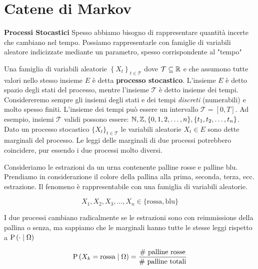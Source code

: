\chapter{Catene di Markov}

\begin{defn}
	\textbf{Processi Stocastici}
	Spesso abbiamo bisogno di rappresentare quantità incerte che cambiano nel tempo. Possiamo rappresentarle con famiglie di variabili aleatore indicizzate mediante un parametro, spesso corrispondente al "tempo"
	
	Una famiglia di variabili aleatorie $ \left\{X_t\right\}_{t\in \mathcal{T}} $ dove $ \mathcal{T} \subseteq \mathbb{R} $ e che assumono tutte valori nello stesso insieme $ E $ è detta \textbf{processo stocastico}. L'insieme $ E $ è detto spazio degli stati del processo, mentre l'insieme $ \mathcal{T} $ è detto insieme dei tempi. Considereremo sempre gli insiemi degli stati e dei tempi \textit{discreti} (numerabili) e molto spesso finiti. L'insieme dei tempi può essere un intervallo $ \mathcal{T} = [0,T] $. Ad esempio, insiemi $ \mathcal{T} $ validi possono essere: $ \mathbb{N}, \mathbb{Z}, \{0, 1, 2, \hdots, n\}, \{t_1, t_2, \hdots, t_n\} $. Dato un processo stocastico $ \{X_t\}_{t \in \mathcal{T}} $ le variabili aleatorie $ X_t \in E $ sono dette marginali del processo. Le leggi delle marginali di due processi potrebbero coincidere, pur essendo i due processi molto diversi.
	
\end{defn}


\begin{exmp}
	
	Consideriamo le estrazioni da un urna contenente palline rosse e palline blu. Prendiamo in considerazione il colore della pallina alla prima, seconda, terza, ecc. estrazione. Il fenomeno è rappresentabile con una famiglia di variabili aleatorie.
	
	\begin{equation*}
	X_1, X_2, X_3, \hdots, X_n \in \{\text{rossa}, \text{blu}\}
	\end{equation*}
	
	I due processi cambiano radicalmente se le estrazioni sono con reimmissione della pallina o senza, ma sappiamo che le marginali hanno tutte le stesse leggi rispetto a $ \text{P}\left(\cdot \mid \Omega\right) $
	
	\begin{equation*}
	\text{P}\left(X_k = \text{rossa} \mid \Omega\right) = \dfrac{\text{\# palline rosse}}{\text{\# palline totali}}
	\end{equation*}
	
\end{exmp}

